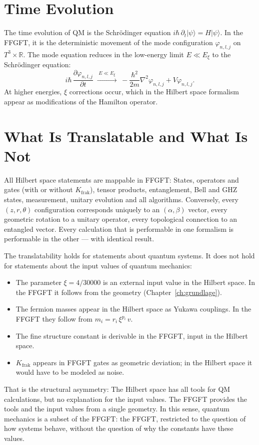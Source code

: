 \section{Time Evolution}

The time evolution of QM is the Schrödinger equation
$i\hbar\,\partial_t|\psi\rangle = H|\psi\rangle$. In the FFGFT, it is the
deterministic movement of the mode configuration $\varphi_{n,l,j}$ on
$T^3\times\mathbb{R}$. The mode equation reduces in the
low-energy limit $E\ll E_\xi$ to the Schrödinger equation:
\begin{equation}
  i\hbar\,\frac{\partial\varphi_{n,l,j}}{\partial t}
  \;\xrightarrow{\;E\ll E_\xi\;}\;
  -\frac{\hbar^2}{2m}\nabla^2\varphi_{n,l,j}+V\varphi_{n,l,j}.
\end{equation}
At higher energies, $\xi$ corrections occur, which in the
Hilbert space formalism appear as modifications of the Hamilton operator.

\section{What Is Translatable and What Is Not}

All Hilbert space statements are mappable in FFGFT: States, operators
and gates (with or without $K_{\mathrm{frak}}$), tensor products,
entanglement, Bell and GHZ states, measurement, unitary evolution and
all algorithms. Conversely, every $(z,r,\theta)$ configuration corresponds uniquely
to an $(\alpha,\beta)$ vector, every geometric rotation to a
unitary operator, every topological connection to an entangled
vector. Every calculation that is performable in one formalism is
performable in the other --- with identical result.

The translatability holds for statements about quantum systems. It does
not hold for statements about the input values of quantum mechanics:
\begin{itemize}
  \item The parameter $\xi = 4/30000$ is an external
        input value in the Hilbert space. In the FFGFT it follows from the geometry
        (Chapter~\ref{ch:grundlage}).
  \item The fermion masses appear in the Hilbert space as Yukawa couplings.
        In the FFGFT they follow from $m_i = r_i\,\xi^{p_i}\,v$.
  \item The fine structure constant is derivable in the FFGFT, input in the
        Hilbert space.
  \item $K_{\mathrm{frak}}$ appears in FFGFT gates as
        geometric deviation; in the Hilbert space it would have to be modeled as noise.
\end{itemize}
That is the structural asymmetry: The Hilbert space has all tools
for QM calculations, but no explanation for the input values. The FFGFT
provides the tools and the input values from a single geometry.
In this sense, quantum mechanics is a subset of the FFGFT: the
FFGFT, restricted to the question of how systems behave, without the
question of why the constants have these values.

